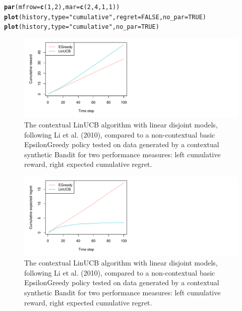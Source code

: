 \documentclass[nojss]{jss}\usepackage[]{graphicx}\usepackage[]{color}
\makeatletter
\def\maxwidth{ %
  \ifdim\Gin@nat@width>\linewidth
    \linewidth
  \else
    \Gin@nat@width
  \fi
}
\newcommand{\hlnum}[1]{\textcolor[rgb]{0.686,0.059,0.569}{#1}}%
\newcommand{\hlstr}[1]{\textcolor[rgb]{0.192,0.494,0.8}{#1}}%
\newcommand{\hlstd}[1]{\textcolor[rgb]{0.345,0.345,0.345}{#1}}%
\newcommand{\hlkwc}[1]{\textcolor[rgb]{0.333,0.667,0.333}{#1}}%
\newcommand{\hlkwd}[1]{\textcolor[rgb]{0.737,0.353,0.396}{\textbf{#1}}}%
\newenvironment{kframe}{%
 \def\at@end@of@kframe{}%
 \ifinner\ifhmode%
  \def\at@end@of@kframe{\end{minipage}}%
  \begin{minipage}{\columnwidth}%
 \fi\fi%
 \def\FrameCommand##1{\hskip\@totalleftmargin \hskip-\fboxsep
 \colorbox{shadecolor}{##1}\hskip-\fboxsep
     \hskip-\linewidth \hskip-\@totalleftmargin \hskip\columnwidth}%
 \MakeFramed {\advance\hsize-\width
   \@totalleftmargin\z@ \linewidth\hsize
   \@setminipage}}%
 {\par\unskip\endMakeFramed%
 \at@end@of@kframe}
\newenvironment{knitrout}{}{} %
\makeatother
\begin{document}
\begin{knitrout}
\begin{kframe}
\begin{alltt}
\hlkwd{par}\hlstd{(}\hlkwc{mfrow} \hlstd{=} \hlkwd{c}\hlstd{(}\hlnum{1}\hlstd{,} \hlnum{2}\hlstd{),} \hlkwc{mar} \hlstd{=} \hlkwd{c}\hlstd{(}\hlnum{2}\hlstd{,}\hlnum{4}\hlstd{,}\hlnum{1}\hlstd{,}\hlnum{1}\hlstd{))}
\hlkwd{plot}\hlstd{(history,} \hlkwc{type} \hlstd{=} \hlstr{"cumulative"}\hlstd{,} \hlkwc{regret} \hlstd{=} \hlnum{FALSE}\hlstd{,} \hlkwc{no_par} \hlstd{=} \hlnum{TRUE}\hlstd{)}
\hlkwd{plot}\hlstd{(history,} \hlkwc{type} \hlstd{=} \hlstr{"cumulative"}\hlstd{,} \hlkwc{no_par} \hlstd{=} \hlnum{TRUE}\hlstd{)}
\end{alltt}
\end{kframe}
\end{knitrout}
\begin{center}
\begin{knitrout}
\color{fgcolor}\begin{figure}[H]
\includegraphics[width=\maxwidth,]{fig/lucbpolicy-1} \caption[The contextual LinUCB algorithm with linear disjoint models, following Li et al]{The contextual LinUCB algorithm with linear disjoint models, following Li et al. (2010), compared to a non-contextual basic EpsilonGreedy policy tested on data generated by a contextual synthetic Bandit for two performance measures: left cumulative reward, right expected cumulative regret. }\label{fig:lucbpolicy1}
\end{figure}

\begin{figure}[H]
\includegraphics[width=\maxwidth,]{fig/lucbpolicy-2} \caption[The contextual LinUCB algorithm with linear disjoint models, following Li et al]{The contextual LinUCB algorithm with linear disjoint models, following Li et al. (2010), compared to a non-contextual basic EpsilonGreedy policy tested on data generated by a contextual synthetic Bandit for two performance measures: left cumulative reward, right expected cumulative regret. }\label{fig:lucbpolicy2}
\end{figure}


\end{knitrout}
\end{center}
\end{document}
